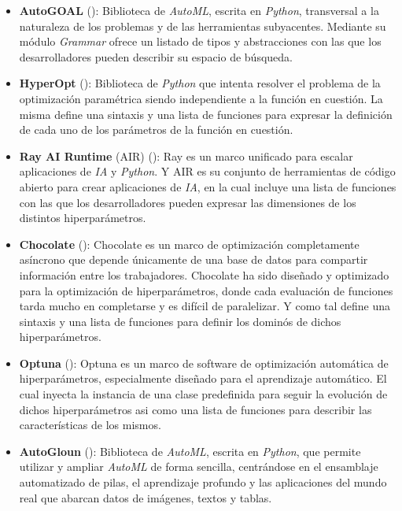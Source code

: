 \begin{itemize}

    \item  {\bf AutoGOAL} (\cite{autogoal}): Biblioteca de {\it AutoML}, escrita en {\it Python}, transversal a la
          naturaleza de los problemas y de las herramientas subyacentes. Mediante su módulo {\it Grammar}
          ofrece un listado de tipos y abstracciones con las que los desarrolladores pueden describir
          su espacio de búsqueda.
    \item {\bf HyperOpt} (\cite{hyperopt}): Biblioteca de {\it Python} que intenta resolver el problema de la optimización
          paramétrica siendo independiente a la función en cuestión. La misma define una sintaxis y
          una lista de funciones para expresar la definición de cada uno de los parámetros de la
          función en cuestión.
    \item {\bf Ray AI Runtime} (AIR) (\cite{ray}): Ray es un marco unificado para escalar aplicaciones de {\it IA} y
              {\it Python}. Y AIR es su conjunto de herramientas de código abierto para crear aplicaciones de
              {\it IA}, en la cual incluye una lista de funciones con las que los desarrolladores pueden expresar
          las dimensiones de los distintos hiperparámetros.
    \item {\bf Chocolate} (\cite{chocolate}): Chocolate es un marco de optimización completamente asíncrono que depende
          únicamente de una base de datos para compartir información entre los trabajadores. Chocolate
          ha sido diseñado y optimizado para la optimización de hiperparámetros, donde cada evaluación
          de funciones tarda mucho en completarse y es difícil de paralelizar. Y como tal define una
          sintaxis y una lista de funciones para definir los dominós de dichos hiperparámetros.
    \item {\bf Optuna} ({\cite{optuna}}): Optuna es un marco de software de optimización automática de hiperparámetros,
          especialmente diseñado para el aprendizaje automático. El cual inyecta la instancia de una
          clase predefinida para seguir la evolución de dichos hiperparámetros asi como
          una lista de funciones para describir las características de los mismos.
    \item {\bf AutoGloun} (\cite{autogloun}): Biblioteca de {\it AutoML}, escrita en {\it Python}, que permite utilizar y
          ampliar {\it AutoML} de forma sencilla, centrándose en el ensamblaje automatizado de pilas, el
          aprendizaje profundo y las aplicaciones del mundo real que abarcan datos de imágenes, textos y tablas.

\end{itemize}
